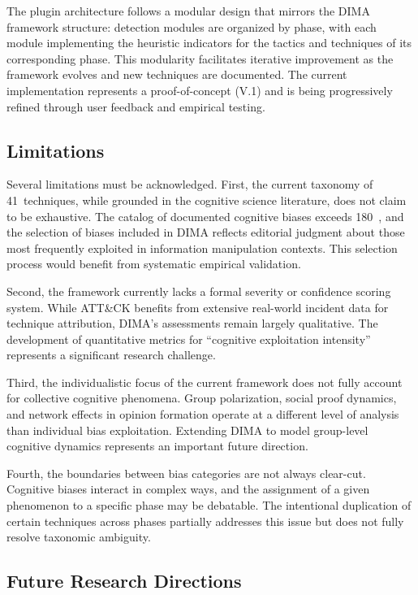 \documentclass[11pt,a4paper]{article}
\begin{document}
The plugin architecture follows a modular design that mirrors the DIMA framework structure: detection modules are organized by phase, with each module implementing the heuristic indicators for the tactics and techniques of its corresponding phase. This modularity facilitates iterative improvement as the framework evolves and new techniques are documented. The current implementation represents a proof-of-concept (V.1) and is being progressively refined through user feedback and empirical testing.

\subsection{Limitations}

Several limitations must be acknowledged. First, the current taxonomy of 41~techniques, while grounded in the cognitive science literature, does not claim to be exhaustive. The catalog of documented cognitive biases exceeds 180~\cite{benson2016}, and the selection of biases included in DIMA reflects editorial judgment about those most frequently exploited in information manipulation contexts. This selection process would benefit from systematic empirical validation.

Second, the framework currently lacks a formal severity or confidence scoring system. While ATT\&CK benefits from extensive real-world incident data for technique attribution, DIMA's assessments remain largely qualitative. The development of quantitative metrics for ``cognitive exploitation intensity'' represents a significant research challenge.

Third, the individualistic focus of the current framework does not fully account for collective cognitive phenomena. Group polarization, social proof dynamics, and network effects in opinion formation operate at a different level of analysis than individual bias exploitation. Extending DIMA to model group-level cognitive dynamics represents an important future direction.

Fourth, the boundaries between bias categories are not always clear-cut. Cognitive biases interact in complex ways, and the assignment of a given phenomenon to a specific phase may be debatable. The intentional duplication of certain techniques across phases partially addresses this issue but does not fully resolve taxonomic ambiguity.

\subsection{Future Research Directions}
\label{sec:future}
\end{document}

